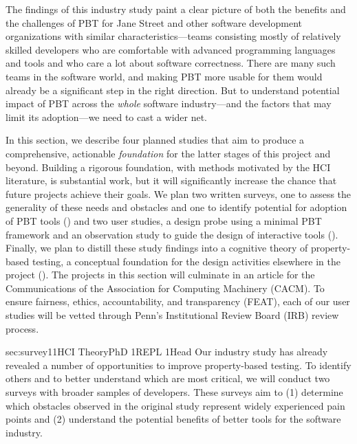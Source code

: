 The findings of this industry study paint a clear
picture of both the benefits and the challenges of PBT for
Jane Street and other software development organizations with similar
characteristics---teams consisting mostly
of relatively skilled developers who are comfortable with
advanced programming languages and tools and who care a lot about
software correctness.  There are many such teams in the software
world, and making PBT more
usable for them would already be a significant step in the
right direction.  But to
understand potential impact of PBT
across the {\em  whole} software
industry---and the factors that may limit its adoption---we need to
cast a wider net.

In this section, we describe four planned studies that aim
to produce a comprehensive, actionable
{\em foundation} for the latter stages of this project and beyond. Building a
rigorous foundation, with methods motivated by the HCI literature, is substantial work,
but it will significantly increase the chance that future projects achieve their goals.
We plan two
written surveys, one to assess the generality of these needs and obstacles
and one to identify potential for adoption of PBT tools
() and two user studies, a design probe using a minimal
PBT framework
and an observation study
to guide the design of
interactive tools
(). Finally, we plan to distill these
study findings into a cognitive
theory of property-based testing, a conceptual foundation for the
design activities elsewhere in the project ().
The projects in this section will culminate in an article for the Communications
of the Association for Computing Machinery (CACM).
%
To ensure fairness, ethics, accountability, and transparency (FEAT),
each of our user studies will be vetted through Penn's Institutional
Review Board (IRB) review process.

%
   {sec:survey}{1}{1}{HCI Theory}{PhD 1}{REPL 1}{Head}
%
Our industry study has already revealed
a number of
opportunities to improve property-based testing. To identify
others and to better understand which are most
critical, we will conduct two
surveys with broader samples of developers. These surveys aim to
(1) determine which obstacles observed in the original
study
represent widely experienced pain points and
(2) understand the potential benefits of better tools for the
software industry.

